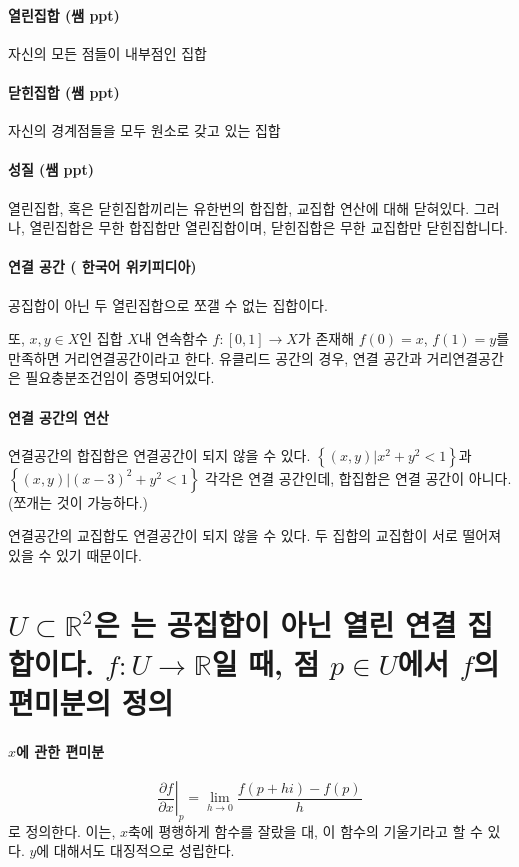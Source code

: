\paragraph{열린집합 (쌤 ppt)}
자신의 모든 점들이 내부점인 집합

\paragraph{닫힌집합 (쌤 ppt)}
자신의 경계점들을 모두 원소로 갖고 있는 집합

\paragraph{성질 (쌤 ppt)}
열린집합, 혹은 닫힌집합끼리는 유한번의 합집합, 교집합 연산에 대해 닫혀있다.
그러나, 열린집합은 무한 합집합만 열린집합이며, 닫힌집합은 무한 교집합만 닫힌집합니다.

\paragraph{연결 공간 ( 한국어 위키피디아)}
공집합이 아닌 두 열린집합으로 쪼갤 수 없는 집합이다.

또, $x,y \in X$인 집합 $X$내 연속함수 $f: [0,1] \to X$가 존재해 $f(0)=x$, $f(1)=y$를 만족하면 거리연결공간이라고 한다.
유클리드 공간의 경우, 연결 공간과 거리연결공간은 필요충분조건임이 증명되어있다.

\paragraph{연결 공간의 연산}
연결공간의 합집합은 연결공간이 되지 않을 수 있다. $\left\{ (x,y) |  x^2 + y^2 < 1 \right\}$과  $\left\{ (x,y) |  (x-3)^2 + y^2 < 1 \right\}$ 각각은 연결 공간인데, 합집합은 연결 공간이 아니다. (쪼개는 것이 가능하다.)

연결공간의 교집합도 연결공간이 되지 않을 수 있다. 두 집합의 교집합이 서로 떨어져 있을 수 있기 때문이다.

\section{$U \subset \mathbb{R}^2$은 는 공집합이 아닌 열린 연결 집합이다. $f: U \to \mathbb{R}$일 때, 점 $p \in U$에서 $f$의 편미분의 정의}
\paragraph{$x$에 관한 편미분}
$$\left.\frac{\partial f }{\partial x} \right|_{p} = \lim_{h \to 0} \frac{f(p+hi)-f(p)}{h}$$로 정의한다. 이는, $x$축에 평행하게 함수를 잘랐을 대, 이 함수의 기울기라고 할 수 있다.
$y$에 대해서도 대징적으로 성립한다.
